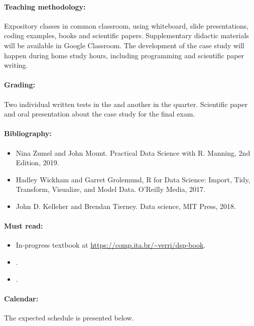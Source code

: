 \paragraph{Teaching methodology:}
Expository classes in common classroom, using whiteboard, slide presentations, coding
examples, books and scientific papers. Supplementary didactic materials will be available
in Google Classroom. The development of the case study will happen during home study
hours, including programming and scientific paper writing.

\paragraph{Grading:} Two individual written tests in the  and another in the  quarter.
Scientific paper and oral presentation about the case study for the final exam.

\paragraph{Bibliography:}
\begin{itemize}
  \item Nina Zumel and John Mount. Practical Data Science with R. Manning, 2nd Edition, 2019.
  \item Hadley Wickham and Garret Grolemund, R for Data Science: Import, Tidy, Transform, Visualize, and Model Data. O’Reilly Media, 2017.
  \item John D. Kelleher and Brendan Tierney. Data science, MIT Press, 2018.
\end{itemize}

\paragraph{Must read:}
\begin{itemize}
  \item In-progress textbook at \url{https://comp.ita.br/~verri/dsp-book}.
  \item {}.
  \item {}.
\end{itemize}
\thispagestyle{empty}

\paragraph{Calendar:} The expected schedule is presented below.


